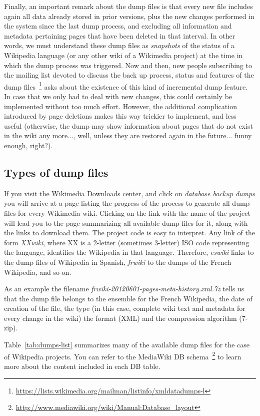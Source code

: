 Finally, an important remark about the dump files is that every new file 
includes again all data already stored in prior versions,
plus the new changes performed in the system since the last dump process, and
excluding all information and metadata pertaining pages that have been deleted
in that interval. In other words, we must understand these dump files as
\textit{snapshots} of the status of a Wikipedia language (or any other wiki of
a Wikimedia project) at the time in which the dump process was triggered. Now and
then, new people subscribing to the mailing list devoted to discuss the back up process,
status and features of the dump files~\footnote{\url{https://lists.wikimedia.org/mailman/listinfo/xmldatadumps-l}}
asks about the existence of this kind of incremental dump feature. In case that
we only had to deal with new changes, this could certainly be implemented without
too much effort. However, the additional complication introduced by page
deletions makes this way trickier to implement, and less useful (otherwise, the
dump may show information about pages that do not exist in the wiki any more...,
well, unless they are restored again in the future... funny enough, right?).

\subsection{Types of dump files}
\label{subsec:type-dump-files}
If you visit the Wikimedia Downloads center, and click on \textit{database backup dumps}
you will arrive at a page listing the progress of the process to generate all
dump files for every Wikimedia wiki. Clicking on the link with the name of the
project will lead you to the page summarizing all available dump files for it,
along with the links to download them. The project code is easy to 
interpret. Any link of the form \textit{XXwiki}, where XX is a 2-letter (sometimes
3-letter) ISO code representing the language, identifies the Wikipedia in that
language. Therefore, \textit{eswiki} links to the dump files of Wikipedia in
Spanish, \textit{frwiki} to the dumps of the French Wikipedia, and so on.

As an example the filename \textit{frwiki-20120601-pages-meta-history.xml.7z} tells
us that the dump file belongs to the ensemble for the French Wikipedia, the
date of creation of the file, the type (in this case, complete wiki text and
metadata for every change in the wiki) the format (XML) and the compression
algorithm (7-zip).

Table~\ref{tab:dumps-list} summarizes many of the available dump files for the
case of Wikipedia projects. You can refer to the MediaWiki 
DB schema~\footnote{\url{http://www.mediawiki.org/wiki/Manual:Database_layout}} to
learn more about the content included in each DB table.

